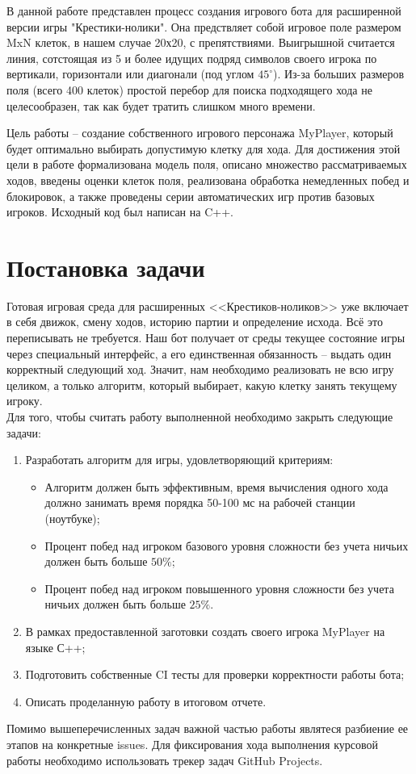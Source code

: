 \documentclass[14pt]{extreport}
\begin{document}
В данной работе представлен процесс создания игрового бота для расширенной версии игры "Крестики-нолики". Она предствляет собой игровое поле размером MxN клеток, в нашем случае 20х20, с препятствиями. Выигрышной считается линия, сотстоящая из 5 и более идущих подряд символов своего игрока по вертикали, горизонтали или диагонали (под углом $45^{\circ}$).
Из-за больших размеров поля (всего 400 клеток) простой перебор для поиска подходящего хода не целесообразен, так как будет тратить слишком много времени.

Цель работы -- создание собственного игрового персонажа MyPlayer, который будет оптимально выбирать допустимую клетку для хода. Для достижения этой цели в работе формализована модель поля, описано множество рассматриваемых ходов, введены оценки клеток поля, реализована обработка немедленных побед и блокировок, а также проведены серии автоматических игр против базовых игроков. Исходный код был написан на C++.

\newpage
{\centering\section{Постановка задачи}}
Готовая игровая среда для расширенных <<Крестиков-ноликов>> уже включает в себя движок, смену ходов, историю партии и определение исхода. Всё это переписывать не требуется. Наш бот получает от среды текущее состояние игры через специальный интерфейс, а его единственная обязанность -- выдать один корректный следующий ход. Значит, нам необходимо реализовать не всю игру целиком, а только алгоритм, который выбирает, какую клетку занять текущему игроку.\\
Для того, чтобы считать работу выполненной необходимо закрыть следующие задачи:
\begin{enumerate}
    \item Разработать алгоритм для игры, удовлетворяющий критериям:
    \begin{itemize}
        \item Алгоритм должен быть эффективным, время вычисления одного хода должно занимать время порядка 50-100 мс на рабочей станции (ноутбуке);
        \item Процент побед над игроком базового уровня сложности без учета ничьих должен быть больше $50\%$; 
        \item Процент побед над игроком повышенного уровня сложности без учета ничьих должен быть больше $25\%$.
    \end{itemize}
    \item В рамках предоставленной заготовки создать своего игрока MyPlayer на языке С++;
    \item Подготовить собственные CI тесты для проверки корректности работы бота;
    \item Описать проделанную работу в итоговом отчете.
\end{enumerate}
Помимо вышеперечисленных задач важной частью работы являтеся разбиение ее этапов на конкретные issues. Для фиксирования хода выполнения курсовой работы необходимо использовать трекер задач GitHub Projects.
\end{document}
